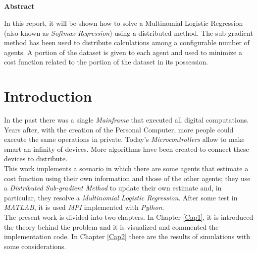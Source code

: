 \documentclass[a4paper,11pt,oneside]{book}
\begin{document}
\pagestyle{myheadings}



\newpage
\thispagestyle{empty}

\begin{center}
\chapter*{}
\thispagestyle{empty}
{\Huge \textbf{Abstract}}\\
\vspace{15mm}
\end{center}
In this report, it will be shown how to solve a Multinomial Logistic Regression (also known as \textit{Softmax Regression}) using a distributed method. The sub-gradient method has been used to distribute calculations among a configurable number of agents. A portion of the dataset is given to each agent and used to minimize a cost function related to the portion of the dataset in its possession.


\tableofcontents \thispagestyle{empty}
\listoffigures\thispagestyle{empty}

\chapter*{Introduction}
In the past there was a single \textit{Mainframe} that executed all digital computations. Years after, with the creation of the Personal Computer, more people could execute the same operations in private. Today's \textit{Microcontrollers} allow to make smart an infinity of devices. More algorithms have been created to connect these devices to distribute.\\
This work implements a scenario in which there are some agents that estimate a cost function using their own information and those of the other agents; they use a \textit{Distributed Sub-gradient Method} to update their own estimate and, in particular, they resolve a \textit{Multinomial Logistic Regression}. After some test in \textit{MATLAB}, it is used \textit{MPI} implemented with \textit{Python}.\\
The present work is divided into two chapters. In Chapter \ref{Cap1}, it is introduced the theory behind the problem and it is visualized and commented the implementation code. In Chapter \ref{Cap2} there are the results of simulations with some considerations.
\end{document}
